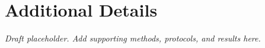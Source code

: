\section{Additional Details}
\label{app:details}
\emph{Draft placeholder. Add supporting methods, protocols, and results here.}
